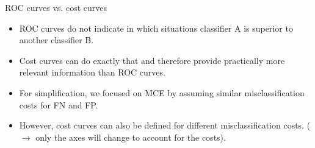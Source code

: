 
\begin{vbframe}{ROC curves vs. cost curves}

\begin{itemize}
  \item ROC curves do not indicate in which situations classifier A is superior to another classifier B.
  \item Cost curves can do exactly that and therefore provide practically more relevant information than ROC curves.
  \item For simplification, we focused on MCE by assuming similar misclassification costs for FN and FP.
  \item However, cost curves can also be defined for different misclassification costs.
  ($\rightarrow$ only the axes will change to account for the costs).
  \end{itemize}

\end{vbframe}


%
%
%
%


\endlecture

